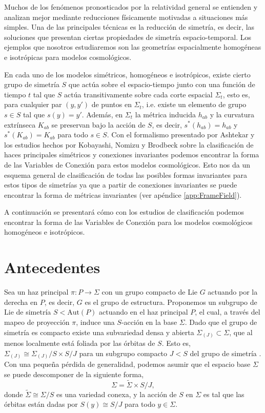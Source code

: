 Muchos de los fen\'{o}menos pronosticados por la relatividad general se entienden y analizan mejor mediante reducciones f\'{i}sicamente motivadas a situaciones m\'{a}s simples. Una de las principales t\'{e}cnicas es la reducci\'{o}n de simetr\'{i}a, es decir, las soluciones que presentan ciertas propiedades de simetr\'{i}a espacio-temporal. Los ejemplos que nosotros estudiaremos son las geometr\'{i}as espacialmente homog\'{e}neas e isotr\'{o}picas para modelos cosmol\'{o}gicos.

En cada uno de los modelos sim\'{e}tricos, homog\'{e}neos e isotr\'{o}picos, existe cierto grupo de simetr\'{i}a $S$ que act\'{u}a sobre el espacio-tiempo junto con una funci\'{o}n de tiempo $t$ tal que $S$ act\'{u}a transitivamente sobre cada corte espacial $\Sigma_{t}$, esto es, para cualquier par $(y, y')$ de puntos en $\Sigma_{t}$, i.e. existe un elemento de grupo $s \in S$ tal que $s(y) = y'$. Adem\'{a}s, en $\Sigma_{t}$  la m\'{e}trica inducida $h_{ab}$ y la curvatura extr\'{i}nseca $K_{ab}$ se preservan bajo la acci\'{o}n de $S$, es decir, $s^{*}(h_{ab}) = h_{ab}$ y $s^{*}(K_{ab}) = K_{ab}$ para todo $s \in S$. Con el formalismo presentado por Ashtekar \cite{Ashtekar86, Ashtekar87} y los estudios hechos por Kobayashi, Nomizu y Brodbeck sobre la clasificaci\'{o}n de haces principales sim\'{e}tricos y conexiones invariantes \cite{Kobayashi, Brodbeck} podemos encontrar la forma de las Variables de Conexi\'{o}n para estos modelos cosmol\'{o}gicos. Esto nos da un esquema general de clasificaci\'{o}n de todas las posibles formas invariantes para estos tipos de simetr\'{i}as ya que a partir de conexiones invariantes se puede encontrar la forma de m\'{e}tricas invariantes (ver ap\'{e}ndice \ref{app:FrameField}).

A continuaci\'{o}n se presentar\'{a} c\'{o}mo con los estudios de clasificaci\'{o}n podemos encontrar la forma de las Variables de Conexi\'{o}n para los modelos cosmol\'{o}gicos homog\'{e}neos e isotr\'{o}picos.

\section{Antecedentes}

Sea un haz principal $\pi: P \longrightarrow \Sigma$ con un grupo compacto de Lie $G$ actuando por la derecha en $P$, es decir, $G$ es el grupo de estructura. Proponemos un subgrupo de Lie de simetr\'{i}a $S < \mathrm{Aut}(P)$ actuando en el haz principal $P$, el cual, a trav\'{e}s del mapeo de proyecci\'{o}n $\pi$, induce una $S$-acci\'{o}n en la base $\Sigma$. Dado que el grupo de simetr\'{i}a es compacto existe una subvariedad densa y abierta $\Sigma_{(J)} \subset \Sigma$, que al menos localmente est\'{a} foliada por las \'{o}rbitas de $S$. Esto es, $\Sigma_{(J)} \cong  \Sigma_{(J)}/S \times S/J$ para un subgrupo compacto $J < S$ del grupo de simetr\'{i}a \cite{Dieck}. Con una peque\~{n}a p\'{e}rdida de generalidad, podemos asumir que el espacio base $\Sigma$ se puede descomponer de la siguiente forma, $$\Sigma = \tilde{\Sigma} \times S/J,$$ donde $\tilde{\Sigma} \cong \Sigma/S$ es una variedad conexa, y la acci\'{o}n de $S$ en $\Sigma$ es tal que las \'{o}rbitas est\'{a}n dadas por $S(y) \cong S/J$ para todo $y \in \Sigma$.

